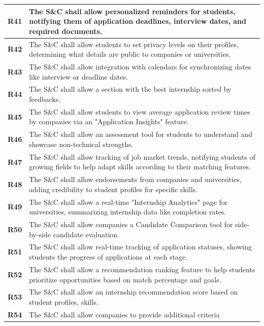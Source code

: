 \begin{longtable}{|p{}|p{}|}
\hline
\textbf{R41} & The S\&C shall allow personalized reminders for students, notifying them of application deadlines, interview dates, and required documents. \\ 
\hline
\textbf{R42} & The S\&C shall allow students to set privacy levels on their profiles, determining what details are public to companies or universities. \\  
\hline
\textbf{R43} & The S\&C shall allow integration with calendars for synchronizing dates like interview or deadline dates. \\ 
\hline
\textbf{R44} & The S\&C shall allow a section with the best internship sorted by feedbacks. \\ 
\hline
\textbf{R45} & The S\&C shall allow students to view average application review times by companies via an "Application Insights" feature. \\ 
\hline
\textbf{R46} & The S\&C shall allow an assessment tool for students to understand and showcase non-technical strengths. \\ 
\hline
\textbf{R47} & The S\&C shall allow tracking of job market trends, notifying students of growing fields to help adapt skills according to their matching features. \\ 
\hline
\textbf{R48} & The S\&C shall allow endorsements from companies and universities, adding credibility to student profiles for specific skills. \\ 
\hline
\textbf{R49} & The S\&C shall allow a real-time "Internship Analytics" page for universities, summarizing internship data like completion rates. \\ 
\hline
\textbf{R50} & The S\&C shall allow companies a Candidate Comparison tool for side-by-side candidate evaluation. \\ 
\hline
\textbf{R51} & The S\&C shall allow real-time tracking of application statuses, showing students the progress of applications at each stage. \\ 
\hline
\textbf{R52} & The S\&C shall allow a recommendation ranking feature to help students prioritize opportunities based on match percentage and goals. \\ 
\hline
\textbf{R53} & The S\&C shall allow an internship recommendation score based on student profiles, skills. \\ 
\hline
\textbf{R54} & The S\&C shall allow companies to provide additional criteria\\
\hline
\end{longtable}
\newpage

